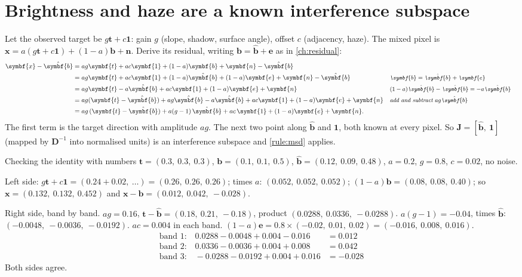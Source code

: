 \documentclass[11pt,a4paper,oneside,openany]{book}
\newcommand{\B}[1]{{\symbf{#1}}}
\newcommand{\B}[1]{{\bm{#1}}}
\newcommand{\vx}{\B{x}}
\newcommand{\vt}{\B{t}}
\newcommand{\vb}{\B{b}}
\newcommand{\vbh}{\hat{\B{b}}}
\newcommand{\ve}{\B{e}}
\newcommand{\vn}{\B{n}}
\newcommand{\vone}{\B{1}}
\newcommand{\mJ}{\B{J}}
\newcommand{\mD}{\B{D}}
\newcommand{\why}[1]{&&\text{\small\itshape #1}}
\begin{document}
\section{Brightness and haze are a known interference subspace}

Let the observed target be $g\vt+c\vone$: gain $g$ (slope, shadow, surface angle), offset $c$ (adjacency, haze). The mixed pixel is
$\vx=a(g\vt+c\vone)+(1-a)\vb+\vn$. Derive its residual, writing $\vb=\vbh+\ve$ as in \cref{ch:residual}:
\begin{align*}
\vx-\vbh &= ag\vt+ac\vone+(1-a)\vb+\vn-\vbh\\
 &= ag\vt+ac\vone+(1-a)\vbh+(1-a)\ve+\vn-\vbh \why{$\vb=\vbh+\ve$}\\
 &= ag\vt-a\vbh+ac\vone+(1-a)\ve+\vn \why{$(1-a)\vbh-\vbh=-a\vbh$}\\
 &= ag(\vt-\vbh)+ag\vbh-a\vbh+ac\vone+(1-a)\ve+\vn \why{add and subtract $ag\vbh$}\\
 &= ag\,(\vt-\vbh)+a(g-1)\,\vbh+ac\,\vone+(1-a)\ve+\vn .
\end{align*}
The first term is the target direction with amplitude $ag$. The next two point along $\vbh$ and $\vone$, both known at every pixel. So
$\mJ=[\vbh,\ \vone]$ (mapped by $\mD^{-1}$ into normalised units) is an interference subspace and \cref{rule:msd} applies.

\begin{worked}[label=we:gainoff]{Checking the identity with numbers}
$\vt=(0.3,\ 0.3,\ 0.3)$, $\vb=(0.1,\ 0.1,\ 0.5)$, $\vbh=(0.12,\ 0.09,\ 0.48)$, $a=0.2$, $g=0.8$, $c=0.02$, no noise.

Left side: $g\vt+c\vone=(0.24+0.02,\ \dots)=(0.26,\ 0.26,\ 0.26)$; times $a$: $(0.052,\ 0.052,\ 0.052)$; $(1-a)\vb=(0.08,\ 0.08,\ 0.40)$; so
$\vx=(0.132,\ 0.132,\ 0.452)$ and $\vx-\vbh=(0.012,\ 0.042,\ -0.028)$.

Right side, band by band. $ag=0.16$, $\vt-\vbh=(0.18,\ 0.21,\ -0.18)$, product $(0.0288,\ 0.0336,\ -0.0288)$. $a(g-1)=-0.04$, times $\vbh$:
$(-0.0048,\ -0.0036,\ -0.0192)$. $ac=0.004$ in each band. $(1-a)\ve=0.8\times(-0.02,\ 0.01,\ 0.02)=(-0.016,\ 0.008,\ 0.016)$.
\begin{align*}
\text{band 1:}\quad 0.0288-0.0048+0.004-0.016 &= 0.012\\
\text{band 2:}\quad 0.0336-0.0036+0.004+0.008 &= 0.042\\
\text{band 3:}\quad -0.0288-0.0192+0.004+0.016 &= -0.028
\end{align*}
Both sides agree.
\end{worked}
\end{document}
